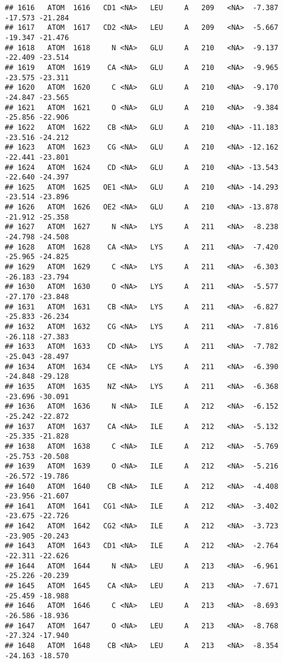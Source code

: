 \documentclass[
]{article}
\begin{document}
\begin{verbatim}
## 1616   ATOM  1616   CD1 <NA>   LEU     A   209   <NA>  -7.387 -17.573 -21.284
## 1617   ATOM  1617   CD2 <NA>   LEU     A   209   <NA>  -5.667 -19.347 -21.476
## 1618   ATOM  1618     N <NA>   GLU     A   210   <NA>  -9.137 -22.409 -23.514
## 1619   ATOM  1619    CA <NA>   GLU     A   210   <NA>  -9.965 -23.575 -23.311
## 1620   ATOM  1620     C <NA>   GLU     A   210   <NA>  -9.170 -24.847 -23.565
## 1621   ATOM  1621     O <NA>   GLU     A   210   <NA>  -9.384 -25.856 -22.906
## 1622   ATOM  1622    CB <NA>   GLU     A   210   <NA> -11.183 -23.516 -24.212
## 1623   ATOM  1623    CG <NA>   GLU     A   210   <NA> -12.162 -22.441 -23.801
## 1624   ATOM  1624    CD <NA>   GLU     A   210   <NA> -13.543 -22.640 -24.397
## 1625   ATOM  1625   OE1 <NA>   GLU     A   210   <NA> -14.293 -23.514 -23.896
## 1626   ATOM  1626   OE2 <NA>   GLU     A   210   <NA> -13.878 -21.912 -25.358
## 1627   ATOM  1627     N <NA>   LYS     A   211   <NA>  -8.238 -24.798 -24.508
## 1628   ATOM  1628    CA <NA>   LYS     A   211   <NA>  -7.420 -25.965 -24.825
## 1629   ATOM  1629     C <NA>   LYS     A   211   <NA>  -6.303 -26.183 -23.794
## 1630   ATOM  1630     O <NA>   LYS     A   211   <NA>  -5.577 -27.170 -23.848
## 1631   ATOM  1631    CB <NA>   LYS     A   211   <NA>  -6.827 -25.833 -26.234
## 1632   ATOM  1632    CG <NA>   LYS     A   211   <NA>  -7.816 -26.118 -27.383
## 1633   ATOM  1633    CD <NA>   LYS     A   211   <NA>  -7.782 -25.043 -28.497
## 1634   ATOM  1634    CE <NA>   LYS     A   211   <NA>  -6.390 -24.848 -29.128
## 1635   ATOM  1635    NZ <NA>   LYS     A   211   <NA>  -6.368 -23.696 -30.091
## 1636   ATOM  1636     N <NA>   ILE     A   212   <NA>  -6.152 -25.242 -22.872
## 1637   ATOM  1637    CA <NA>   ILE     A   212   <NA>  -5.132 -25.335 -21.828
## 1638   ATOM  1638     C <NA>   ILE     A   212   <NA>  -5.769 -25.753 -20.508
## 1639   ATOM  1639     O <NA>   ILE     A   212   <NA>  -5.216 -26.572 -19.786
## 1640   ATOM  1640    CB <NA>   ILE     A   212   <NA>  -4.408 -23.956 -21.607
## 1641   ATOM  1641   CG1 <NA>   ILE     A   212   <NA>  -3.402 -23.675 -22.726
## 1642   ATOM  1642   CG2 <NA>   ILE     A   212   <NA>  -3.723 -23.905 -20.243
## 1643   ATOM  1643   CD1 <NA>   ILE     A   212   <NA>  -2.764 -22.311 -22.626
## 1644   ATOM  1644     N <NA>   LEU     A   213   <NA>  -6.961 -25.226 -20.239
## 1645   ATOM  1645    CA <NA>   LEU     A   213   <NA>  -7.671 -25.459 -18.988
## 1646   ATOM  1646     C <NA>   LEU     A   213   <NA>  -8.693 -26.586 -18.936
## 1647   ATOM  1647     O <NA>   LEU     A   213   <NA>  -8.768 -27.324 -17.940
## 1648   ATOM  1648    CB <NA>   LEU     A   213   <NA>  -8.354 -24.163 -18.570

\end{verbatim}
\end{document}
